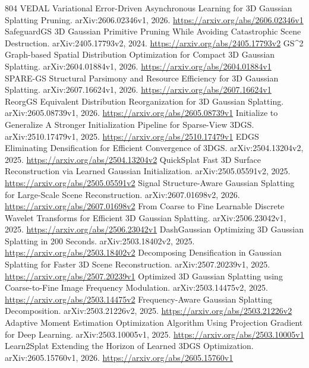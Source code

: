 \documentclass[11pt]{article}
\begin{document}
\begin{thebibliography}{804}
 VEDAL Variational Error-Driven Asynchronous Learning for 3D Gaussian Splatting Pruning. arXiv:2606.02346v1, 2026. \url{https://arxiv.org/abs/2606.02346v1}
 SafeguardGS 3D Gaussian Primitive Pruning While Avoiding Catastrophic Scene Destruction. arXiv:2405.17793v2, 2024. \url{https://arxiv.org/abs/2405.17793v2}
 GS\textasciicircum{}2 Graph-based Spatial Distribution Optimization for Compact 3D Gaussian Splatting. arXiv:2604.01884v1, 2026. \url{https://arxiv.org/abs/2604.01884v1}
 SPARE-GS Structural Parsimony and Resource Efficiency for 3D Gaussian Splatting. arXiv:2607.16624v1, 2026. \url{https://arxiv.org/abs/2607.16624v1}
 ReorgGS Equivalent Distribution Reorganization for 3D Gaussian Splatting. arXiv:2605.08739v1, 2026. \url{https://arxiv.org/abs/2605.08739v1}
 Initialize to Generalize A Stronger Initialization Pipeline for Sparse-View 3DGS. arXiv:2510.17479v1, 2025. \url{https://arxiv.org/abs/2510.17479v1}
 EDGS Eliminating Densification for Efficient Convergence of 3DGS. arXiv:2504.13204v2, 2025. \url{https://arxiv.org/abs/2504.13204v2}
 QuickSplat Fast 3D Surface Reconstruction via Learned Gaussian Initialization. arXiv:2505.05591v2, 2025. \url{https://arxiv.org/abs/2505.05591v2}
 Signal Structure-Aware Gaussian Splatting for Large-Scale Scene Reconstruction. arXiv:2607.01698v2, 2026. \url{https://arxiv.org/abs/2607.01698v2}
 From Coarse to Fine Learnable Discrete Wavelet Transforms for Efficient 3D Gaussian Splatting. arXiv:2506.23042v1, 2025. \url{https://arxiv.org/abs/2506.23042v1}
 DashGaussian Optimizing 3D Gaussian Splatting in 200 Seconds. arXiv:2503.18402v2, 2025. \url{https://arxiv.org/abs/2503.18402v2}
 Decomposing Densification in Gaussian Splatting for Faster 3D Scene Reconstruction. arXiv:2507.20239v1, 2025. \url{https://arxiv.org/abs/2507.20239v1}
 Optimized 3D Gaussian Splatting using Coarse-to-Fine Image Frequency Modulation. arXiv:2503.14475v2, 2025. \url{https://arxiv.org/abs/2503.14475v2}
 Frequency-Aware Gaussian Splatting Decomposition. arXiv:2503.21226v2, 2025. \url{https://arxiv.org/abs/2503.21226v2}
 Adaptive Moment Estimation Optimization Algorithm Using Projection Gradient for Deep Learning. arXiv:2503.10005v1, 2025. \url{https://arxiv.org/abs/2503.10005v1}
 Learn2Splat Extending the Horizon of Learned 3DGS Optimization. arXiv:2605.15760v1, 2026. \url{https://arxiv.org/abs/2605.15760v1}

\end{thebibliography}
\end{document}
